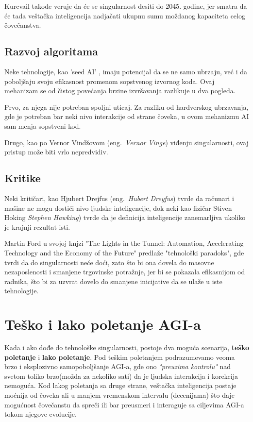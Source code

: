 \documentclass[a4paper]{article}
\begin{document}
Kurcvail takođe veruje da će se singularnost desiti do 2045. godine, jer smatra da će tada veštačka inteligencija nadjačati ukupnu sumu moždanog kapaciteta celog čovečanstva. \cite{mog-6}


\subsection{Razvoj algoritama}

Neke tehnologije, kao 'seed AI' \cite{mog-7}, imaju potencijal da se ne samo ubrzaju, već i da poboljšaju svoju efikasnost promenom sopstvenog izvornog koda. 
Ovaj mehanizam se od čistog povećanja brzine izvršavanja razlikuje u dva pogleda.

Prvo, za njega nije potreban spoljni uticaj. Za razliku od hardverskog ubrzavanja, gde je potreban bar neki nivo interakcije od strane čoveka, u ovom mehanizmu AI sam menja sopstveni kod.

Drugo, kao po Vernor Vindžovom (eng.~{\em Vernor Vinge}) viđenju singularnosti, ovaj pristup može biti vrlo nepredvidiv. \cite{mog-8}

\subsection{Kritike}

Neki kritičari, kao Hjubert Drejfus (eng.~{\em Hubert Dreyfus}) tvrde da računari i mašine ne mogu dostići nivo ljudske inteligencije, dok neki kao fizičar Stiven Hoking {\em Stephen Hawking}) tvrde da je definicija inteligencije zanemarljiva ukoliko je krajnji rezultat isti. \cite{mog-9}

Martin Ford u svojoj knjzi "The Lights in the Tunnel: Automation, Accelerating Technology and the Economy of the Future" predlaže "tehnološki paradoks", gde tvrdi da do singularnosti neće doći, zato što bi ona dovela do masovne nezaposlenosti i smanjene trgovinske potražnje, jer bi se pokazala efikasnijom od radnika, što bi za uzvrat dovelo do smanjene inicijative da se ulaže u iste tehnologije. \cite{mog-10}


\section{Teško i lako poletanje AGI-a}
\label{sec:poletanje}
Kada i ako dođe do tehnološke singularnosti, postoje dva moguća scenarija, \textbf{teško poletanje} i \textbf {lako poletanje}.
Pod teškim poletanjem podrazumevamo veoma brzo i eksplozivno samopoboljšanje AGI-a, gde ono \textit{"preuzima kontrolu"} nad svetom toliko brzo(možda za nekoliko sati) da je ljudska interakcija i korekcija nemoguća. Kod lakog poletanja sa druge strane, veštačka inteligencija postaje moćnija od čoveka ali u manjem vremenskom intervalu (decenijama) što daje mogućnost čovečanstu da spreči ili bar preusmeri i interaguje sa ciljevima AGI-a tokom njegove evolucije.\cite{refe1}
\end{document}
